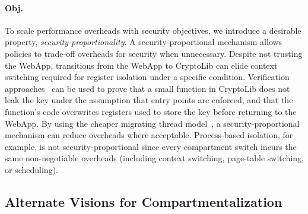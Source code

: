\paragraph{Obj. }
To scale performance overheads with security objectives, we
introduce a desirable property, \emph{security-proportionality}.
A security-proportional mechanism allows policies to trade-off 
overheads for security when unnecessary.
Despite not trusting the WebApp, transitions from the WebApp to
CryptoLib can elide context switching required for register 
isolation under a specific condition.
Verification approaches~\cite{KolosickNJWLGJS22Verizero,ChenRSL16} 
can be used to prove that a small function in CryptoLib does not leak the key
under the assumption that entry points are enforced,
and that the function's code overwrites registers used to store the key 
before returning to the WebApp.
By using the cheaper migrating thread model~\cite{FordL94},
a security-proportional mechanism can reduce overheads where acceptable.
Process-based isolation, for example, is not security-proportional
since every compartment switch incurs the same non-negotiable overheads 
(including context switching, page-table switching, or scheduling).

\subsection{Alternate Visions for Compartmentalization}
\label{sec:seccells:reqs:related}

